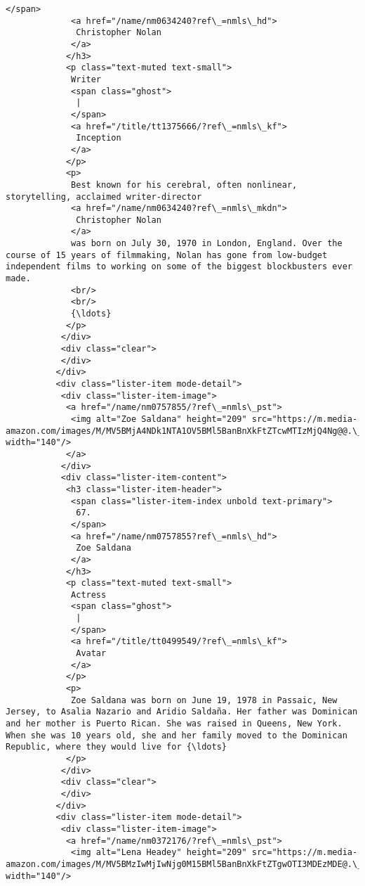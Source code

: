 \documentclass[11pt]{article}
\begin{document}
\begin{Verbatim}[commandchars=\\\{\}]
             </span>
             <a href="/name/nm0634240?ref\_=nmls\_hd">
              Christopher Nolan
             </a>
            </h3>
            <p class="text-muted text-small">
             Writer
             <span class="ghost">
              |
             </span>
             <a href="/title/tt1375666/?ref\_=nmls\_kf">
              Inception
             </a>
            </p>
            <p>
             Best known for his cerebral, often nonlinear, storytelling, acclaimed writer-director
             <a href="/name/nm0634240?ref\_=nmls\_mkdn">
              Christopher Nolan
             </a>
             was born on July 30, 1970 in London, England. Over the course of 15 years of filmmaking, Nolan has gone from low-budget independent films to working on some of the biggest blockbusters ever made.
             <br/>
             <br/>
             {\ldots}
            </p>
           </div>
           <div class="clear">
           </div>
          </div>
          <div class="lister-item mode-detail">
           <div class="lister-item-image">
            <a href="/name/nm0757855/?ref\_=nmls\_pst">
             <img alt="Zoe Saldana" height="209" src="https://m.media-amazon.com/images/M/MV5BMjA4NDk1NTA1OV5BMl5BanBnXkFtZTcwMTIzMjQ4Ng@@.\_V1\_UY209\_CR6,0,140,209\_AL\_.jpg" width="140"/>
            </a>
           </div>
           <div class="lister-item-content">
            <h3 class="lister-item-header">
             <span class="lister-item-index unbold text-primary">
              67.
             </span>
             <a href="/name/nm0757855?ref\_=nmls\_hd">
              Zoe Saldana
             </a>
            </h3>
            <p class="text-muted text-small">
             Actress
             <span class="ghost">
              |
             </span>
             <a href="/title/tt0499549/?ref\_=nmls\_kf">
              Avatar
             </a>
            </p>
            <p>
             Zoe Saldana was born on June 19, 1978 in Passaic, New Jersey, to Asalia Nazario and Aridio Saldaña. Her father was Dominican and her mother is Puerto Rican. She was raised in Queens, New York. When she was 10 years old, she and her family moved to the Dominican Republic, where they would live for {\ldots}
            </p>
           </div>
           <div class="clear">
           </div>
          </div>
          <div class="lister-item mode-detail">
           <div class="lister-item-image">
            <a href="/name/nm0372176/?ref\_=nmls\_pst">
             <img alt="Lena Headey" height="209" src="https://m.media-amazon.com/images/M/MV5BMzIwMjIwNjg0M15BMl5BanBnXkFtZTgwOTI3MDEzMDE@.\_V1\_UY209\_CR10,0,140,209\_AL\_.jpg" width="140"/>

\end{Verbatim}
\end{document}
